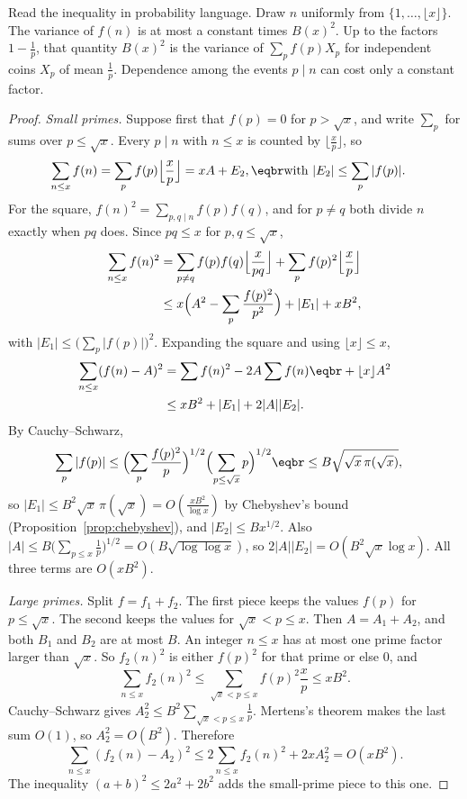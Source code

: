 Read the inequality in probability language. Draw $n$ uniformly from $\{1,\dots,\lfloor x\rfloor\}$. The variance of $f(n)$ is at most a constant times $B(x)^2$. Up to the factors $1-\frac1p$, that quantity $B(x)^2$ is the variance of $\sum_pf(p)X_p$ for independent coins $X_p$ of mean $\frac1p$. Dependence among the events $p\mid n$ can cost only a constant factor.

\begin{proof}
\emph{Small primes.} Suppose first that $f(p)=0$ for $p>\sqrt x$, and write $\sum_p$ for sums over $p\le\sqrt x$. Every $p\mid n$ with $n\le x$ is counted by $\lfloor\frac xp\rfloor$, so
\[
\begin{aligned}\sum_{n\le x}f(n)&=\sum_pf(p)\Bigl\lfloor\frac xp\Bigr\rfloor=xA+E_2,\eqbr\text{with }|E_2|\le\sum_p|f(p)|.\end{aligned}
\]
For the square, $f(n)^2=\sum_{p,q\mid n}f(p)f(q)$, and for $p\ne q$ both divide $n$ exactly when $pq$ does. Since $pq\le x$ for $p,q\le\sqrt x$,
\[
\begin{aligned}\sum_{n\le x}f(n)^2&=\sum_{p\ne q}f(p)f(q)\Bigl\lfloor\frac x{pq}\Bigr\rfloor+\sum_pf(p)^2\Bigl\lfloor\frac xp\Bigr\rfloor\\&\le x\Bigl(A^2-\sum_p\frac{f(p)^2}{p^2}\Bigr)+|E_1|+xB^2,\end{aligned}
\]
with $|E_1|\le\bigl(\sum_p|f(p)|\bigr)^2$. Expanding the square and using $\lfloor x\rfloor\le x$,
\[
\begin{aligned}\sum_{n\le x}(f(n)-A)^2&=\sum f(n)^2-2A\sum f(n)\eqbr+\lfloor x\rfloor A^2\\&\le xB^2+|E_1|+2|A||E_2|.\end{aligned}
\]
By Cauchy--Schwarz,
\[
\begin{aligned}\sum_p|f(p)|&\le\Bigl(\sum_p\frac{f(p)^2}p\Bigr)^{1/2}\Bigl(\sum_{p\le\sqrt x}p\Bigr)^{1/2}\eqbr\le B\sqrt{\sqrt x\,\pi(\sqrt x)},\end{aligned}
\]
so $|E_1|\le B^2\sqrt x\,\pi(\sqrt x)=O(\frac{xB^2}{\log x})$ by Chebyshev's bound
(Proposition~\ref{prop:chebyshev}), and $|E_2|\le Bx^{1/2}$. Also $|A|\le B\bigl(\sum_{p\le x}\frac1p\bigr)^{1/2}=O(B\sqrt{\log\log x})$, so $2|A||E_2|=O(B^2\sqrt x\log x)$. All three terms are $O(xB^2)$.

\emph{Large primes.} Split $f=f_1+f_2$. The first piece keeps the values $f(p)$ for $p\le\sqrt x$. The second keeps the values for $\sqrt x<p\le x$. Then $A=A_1+A_2$, and both $B_1$ and $B_2$ are at most $B$. An integer $n\le x$ has at most one prime factor larger than $\sqrt x$. So $f_2(n)^2$ is either $f(p)^2$ for that prime or else $0$, and
\[
\sum_{n\le x}f_2(n)^2\le\sum_{\sqrt x<p\le x}f(p)^2\frac xp\le xB^2.
\]
Cauchy--Schwarz gives $A_2^2\le B^2\sum_{\sqrt x<p\le x}\frac1p$. Mertens's theorem makes the last sum $O(1)$, so $A_2^2=O(B^2)$. Therefore
\[
\sum_{n\le x}(f_2(n)-A_2)^2\le 2\sum_{n\le x}f_2(n)^2+2xA_2^2=O(xB^2).
\]
The inequality $(a+b)^2\le 2a^2+2b^2$ adds the small-prime piece to this one.
\end{proof}

